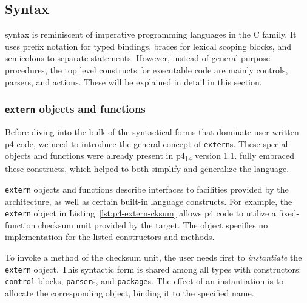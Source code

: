 \subsection{Syntax}




\pfs syntax is reminiscent of imperative programming languages in the C family.
It uses prefix notation for typed bindings, braces for lexical scoping blocks,
and semicolons to separate statements. However, instead of general-purpose
procedures, the top level constructs for executable code are mainly controls,
parsers, and actions. These will be explained in detail in this section.

\subsubsection*{\texttt{extern} objects and functions}

Before diving into the bulk of the syntactical forms that dominate user-written
\acrshort{p4} code, we need to introduce the general concept of
\texttt{extern}s. These special objects and functions were already present in
\acrshort{p4}\textsubscript{14} version 1.1. \pfs fully embraced these
constructs, which helped to both simplify and generalize the language.

\texttt{extern} objects and functions describe interfaces to facilities provided
by the architecture, as well as certain built-in language
constructs. For example,
the \texttt{extern} object in Listing~\ref{lst:p4-extern-cksum} allows
\acrshort{p4} code to utilize a fixed-function checksum unit provided by the
target. The object specifies no implementation for the listed constructors and
methods.

To invoke a method of the checksum unit, the user needs first to
\emph{instantiate} the \texttt{extern} object. This syntactic form is shared
among all types with constructors: \texttt{control} blocks, \texttt{parser}s,
and \texttt{package}s. The effect of an
instantiation is to allocate the corresponding object, binding it to the
specified name.

